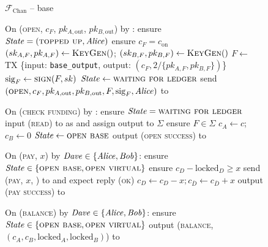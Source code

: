 \begin{figure}[H]
  \begin{systembox}{$\mathcal{F}_{\mathrm{Chan}}$ -- base}
    \begin{algorithmic}[1]
      \State On (\textsc{open}, $c_F$, $pk_{A, \mathrm{out}}$, $pk_{B,
      \mathrm{out}}$) by \alice:
      \Indent
        \State ensure $\mathit{State} = (\textsc{topped up}, \mathit{Alice})$
        \State ensure $c_F = c_{\mathrm{on}}$
        \State $(sk_{A, F}, pk_{A, F}) \gets \textsc{KeyGen}()$; $(sk_{B, F},
        pk_{B, F}) \gets \textsc{KeyGen}()$
        \State $F \gets$ TX \{input: \texttt{base\_output}, output: $(c_F,
        2/\{pk_{A, F}, pk_{B, F}\})$\}
        \State $\mathrm{sig}_F \gets \textsc{sign}(F, sk)$
        \State $\mathit{State} \gets \textsc{waiting for ledger}$
        \State send $(\textsc{open}, c_F, pk_{A, \mathrm{out}}, pk_{B,
        \mathrm{out}}, F, \mathrm{sig}_F, \mathit{Alice})$ to \adversary
      \EndIndent
      \Statex

      \State On (\textsc{check funding}) by \alice:
      \Indent
        \State ensure $\mathit{State} = \textsc{waiting for ledger}$
        \State input (\textsc{read}) to \ledger as \alice and assign output to
        $\Sigma$
        \State ensure $F \in \Sigma$
        \State $c_A \gets c$; $c_B \gets 0$
        \State $\mathit{State} \gets \textsc{open base}$
        \State output (\textsc{open success}) to \alice
      \EndIndent
      \Statex

      \State On (\textsc{pay}, $x$) by $\mathit{Dave} \in \{\mathit{Alice}, \mathit{Bob}\}$:
      \Indent
        \State ensure $\mathit{State} \in \{\textsc{open base}, \textsc{open
        virtual}\}$
        \State ensure $c_D - \mathrm{locked}_D \geq x$
        \State send (\textsc{pay}, $x$, \dave) to \adversary and expect reply
        (\textsc{ok})
        \State $c_D \gets c_D - x; c_{\bar{D}} \gets c_{\bar{D}} + x$
        \State output (\textsc{pay success}) to \dave
      \EndIndent
      \Statex

      \State On (\textsc{balance}) by $\mathit{Dave} \in \{\mathit{Alice}, \mathit{Bob}\}$:
      \Indent
        \State ensure $\mathit{State} \in \{\textsc{open base}, \textsc{open
        virtual}\}$
        \State output (\textsc{balance}, $(c_A, c_B, \mathrm{locked}_A,
        \mathrm{locked}_B)$) to \dave %
      \EndIndent
    \end{algorithmic}
  \end{systembox}
  \caption{}
  \label{code:functionality:chan:skeleton:base}
\end{figure}

